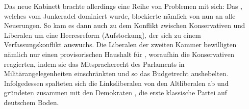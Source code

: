 Das neue Kabinett brachte allerdings eine Reihe von Problemen mit
sich: Das , welches vom Junkeradel 
dominiert wurde, blockierte nämlich von nun an alle Neuerungen. So kam
es dann auch zu dem Konflikt zwischen Konservativen und Liberalen um
eine Heeresreform (Aufstockung), der sich zu einem Verfassungskonflikt
auswuchs. Die Liberalen der zweiten Kammer bewilligten nämlich nur
einen provisorischen Haushalt für , woraufhin die
Konservativen reagierten, indem sie das Mitspracherecht des Parlaments
in Militärangelegenheiten einschränkten und so das Budgetrecht
aushebelten. Infolgedessen spalteten sich die Linksliberalen von den
Altliberalen ab und gründeten zusammen mit den Demokraten , die erste klassische Partei auf
deutschem Boden.

\endinput
